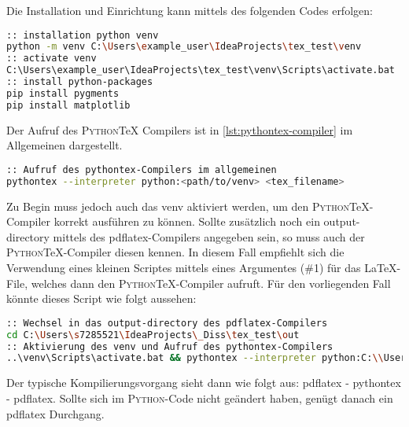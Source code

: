 \documentclass[class=tudscrartcl, crop=false, cdfont=false, cd=true]{standalone}
\newcommand*{\python}{\mbox{\textsc{Python}}\xspace}
\newcommand*{\pythontex}{\mbox{\textsc{Python}}\TeX\xspace}
\begin{document}
    Die Installation und Einrichtung kann mittels des folgenden Codes erfolgen:
\begin{lstlisting}[language=bash, style=bashstyle, caption=Installation von \texttt{pygments} für \pythontex,label={lst:pygments-installation}]
:: installation python venv
python -m venv C:\Users\example_user\IdeaProjects\tex_test\venv
:: activate venv
C:\Users\example_user\IdeaProjects\tex_test\venv\Scripts\activate.bat
:: install python-packages
pip install pygments
pip install matplotlib
\end{lstlisting}

    Der Aufruf des \pythontex Compilers ist in \autoref{lst:pythontex-compiler} im Allgemeinen dargestellt.
    \begin{lstlisting}[language=bash, style=bashstyle, caption={Aufruf des \pythontex Compilers}, label={lst:pythontex-compiler}]
:: Aufruf des pythontex-Compilers im allgemeinen
pythontex --interpreter python:<path/to/venv> <tex_filename>
\end{lstlisting}
    Zu Begin muss jedoch auch das venv aktiviert werden, um den \pythontex-Compiler korrekt ausführen zu können.
    Sollte zusätzlich noch ein output-directory mittels des pdflatex-Compilers angegeben sein, so muss auch der \pythontex-Compiler diesen kennen.
    In diesem Fall empfiehlt sich die Verwendung eines kleinen Scriptes mittels eines Argumentes (\#1) für das \LaTeX-File, welches dann den \pythontex-Compiler aufruft.
    Für den vorliegenden Fall könnte dieses Script wie folgt aussehen:
\begin{lstlisting}[language=bash, style=bashstyle, caption=Script für den Aufruf des \pythontex-Compilers,label={lst:pythontex-start-script}]
:: Wechsel in das output-directory des pdflatex-Compilers
cd C:\Users\s7285521\IdeaProjects\_Diss\tex_test\out
:: Aktivierung des venv und Aufruf des pythontex-Compilers
..\venv\Scripts\activate.bat && pythontex --interpreter python:C:\\Users\\s7285521\\IdeaProjects\\_Diss\\tex_test\\venv\\Scripts\\python.exe %1
\end{lstlisting}

    Der typische Kompilierungsvorgang sieht dann wie folgt aus: pdflatex - pythontex - pdflatex.
    Sollte sich im \python-Code nicht geändert haben, genügt danach ein pdflatex Durchgang.
\end{document}
